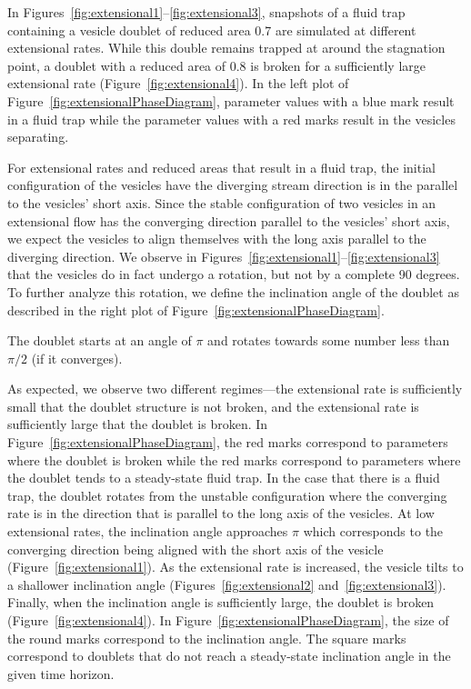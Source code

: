 \documentclass[prf,superscriptaddress,showpacs]{revtex4-1}
\begin{document}
In Figures~\ref{fig:extensional1}--\ref{fig:extensional3}, snapshots of
a fluid trap containing a vesicle doublet of reduced area 0.7 are
simulated at different extensional rates.  While this double remains
trapped at around the stagnation point, a doublet with a reduced area of
0.8 is broken for a sufficiently large extensional rate
(Figure~\ref{fig:extensional4}).  In the left plot of
Figure~\ref{fig:extensionalPhaseDiagram}, parameter values with a blue
mark result in a fluid trap while the parameter values with a red marks
result in the vesicles separating.

For extensional rates and reduced areas that result in a fluid trap, the
initial configuration of the vesicles have the diverging stream
direction is in the parallel to the vesicles' short axis.  Since the
stable configuration of two vesicles in an extensional flow has the
converging direction parallel to the vesicles' short axis, we expect the
vesicles to align themselves with the long axis parallel to the
diverging direction.  We observe in 
Figures~\ref{fig:extensional1}--\ref{fig:extensional3} that the vesicles
do in fact undergo a rotation, but not by a complete 90 degrees.  To
further analyze this rotation, we define the inclination angle of the
doublet as described in the right plot of
Figure~\ref{fig:extensionalPhaseDiagram}.


The doublet starts at an angle of $\pi$ and rotates towards some number
less than $\pi/2$ (if it converges).

As expected, we observe two different regimes---the extensional rate is
sufficiently small that the doublet structure is not broken, and the
extensional rate is sufficiently large that the doublet is broken.  In
Figure~\ref{fig:extensionalPhaseDiagram}, the red marks correspond to
parameters where the doublet is broken while the red marks correspond to
parameters where the doublet tends to a steady-state fluid trap.  In the
case that there is a fluid trap, the doublet rotates from the unstable
configuration where the converging rate is in the direction that is
parallel to the long axis of the vesicles.  At low extensional rates,
the inclination angle approaches $\pi$ which corresponds to the
converging direction being aligned with the short axis of the vesicle
(Figure~\ref{fig:extensional1}).  As the extensional rate is increased,
the vesicle tilts to a shallower inclination angle
(Figures~\ref{fig:extensional2} and~\ref{fig:extensional3}).  Finally,
when the inclination angle is sufficiently large, the doublet is broken
(Figure~\ref{fig:extensional4}).  In
Figure~\ref{fig:extensionalPhaseDiagram}, the size of the round marks
correspond to the inclination angle.  The square marks correspond to
doublets that do not reach a steady-state inclination angle in the given
time horizon.
\end{document}
